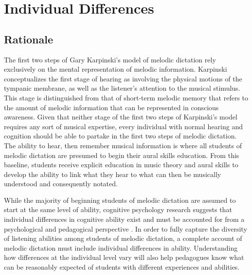 \documentclass[12pt,]{book}
\begin{document}
\hypertarget{individual-differences}{%
\chapter{Individual Differences}\label{individual-differences}}

\hypertarget{rationale-1}{%
\section{Rationale}\label{rationale-1}}

The first two steps of Gary Karpinski's model of melodic dictation \citep{karpinskiAuralSkillsAcquisition2000, karpinskiModelMusicPerception1990} rely exclusively on the mental representation of melodic information.
Karpinski conceptualizes the first stage of hearing as involving the physical motions of the tympanic membrane, as well as the listener's attention to the musical stimulus.
This stage is distinguished from that of short-term melodic memory that refers to the amount of melodic information that can be represented in conscious awareness.
Given that neither stage of the first two steps of Karpinski's model requires any sort of musical expertise, every individual with normal hearing and cognition should be able to partake in the first two steps of melodic dictation.
The ability to hear, then remember musical information is where all students of melodic dictation are presumed to begin their aural skills education.
From this baseline, students receive explicit education in music theory and aural skills to develop the ability to link what they hear to what can then be musically understood and consequently notated.

While the majority of beginning students of melodic dictation are assumed to start at the same level of ability, cognitive psychology research suggests that individual differences in cognitive ability exist and must be accounted for from a psychological and pedagogical perspective \citep{cowanWorkingMemoryCapacity2005, ritchieIntelligenceAllThat2015}.
In order to fully capture the diversity of listening abilities among students of melodic dictation, a complete account of melodic dictation must include individual differences in ability.
Understanding how differences at the individual level vary will also help pedagogues know what can be reasonably expected of students with different experiences and abilities.
\end{document}
